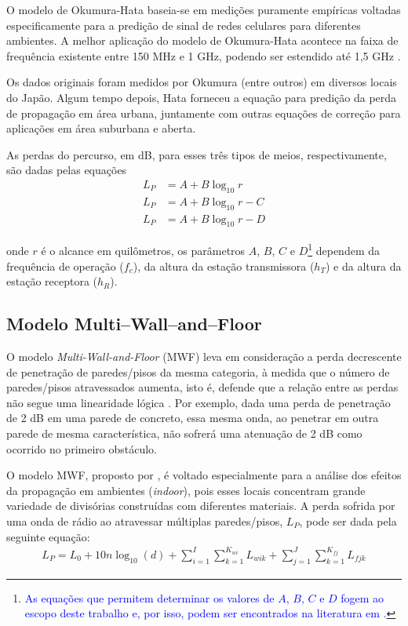 O modelo de Okumura-Hata baseia-se em medições puramente empíricas voltadas especificamente para a predição de sinal de redes celulares para diferentes ambientes. A melhor aplicação do modelo de Okumura-Hata acontece na faixa de frequência existente entre 150 MHz e 1 GHz, podendo ser estendido até 1,5 GHz \cite{haykin2008,rappaport2009}. 

Os dados originais foram medidos por Okumura (entre outros) em diversos locais do Japão. Algum tempo depois, Hata forneceu a equação para predição da perda de propagação em área urbana, juntamente com outras equações de correção para aplicações em área suburbana e aberta.

As perdas do percurso, em dB, para esses três tipos de meios, respectivamente, são dadas pelas equações
\begin{equation}
\begin{split}
	\label{eq:okumura-hata}
		L_P & = A + B\log_{10}r \\
		L_P & = A + B\log_{10}r - C \\
		L_P & = A + B\log_{10}r - D
\end{split}
\end{equation}

\noindent onde $r$ é o alcance em quilômetros, os parâmetros $A$, $B$, $C$ e $D$\footnote[2]{\textcolor{blue}{As equações que permitem determinar os valores de $A$, $B$, $C$ e $D$ fogem ao escopo deste trabalho e, por isso, podem ser encontrados na literatura em .}} dependem da frequência de operação ($f_c$), da altura da estação transmissora ($h_T$) e da altura da estação receptora ($h_R$).

\subsection{Modelo Multi--Wall--and--Floor}
\label{sub:modelo-MWF}

O modelo \emph{Multi-Wall-and-Floor} (MWF) leva em consideração a perda decrescente de penetração de paredes/pisos da mesma categoria, à medida que o número de paredes/pisos atravessados aumenta, isto é, defende que a relação entre as  perdas não segue uma linearidade lógica \cite{lott2001ieee}. Por exemplo, dada uma perda de penetração de 2 dB em uma parede de concreto, essa mesma onda, ao penetrar em outra parede de mesma característica, não sofrerá uma atenuação de 2 dB como ocorrido no primeiro obstáculo.

O modelo MWF, proposto por , é voltado especialmente para a análise dos efeitos da propagação em ambientes (\textit{indoor}), pois esses locais concentram grande variedade de divisórias construídas com diferentes materiais. A perda sofrida por uma onda de rádio ao atravessar múltiplas paredes/pisos, $L_{P}$, pode ser dada pela seguinte equação:
\begin{equation}
	\begin{aligned}
	\label{eq:mwf}
		L_{P} = L_0 + 10n\log_{10}(d) + \sum_{i=1}^{I} \sum_{k=1}^{K_{wi}} L_{wik} + \sum_{j=1}^{J} \sum_{k=1}^{K_{fj}} L_{fjk}
	\end{aligned}
\end{equation}

